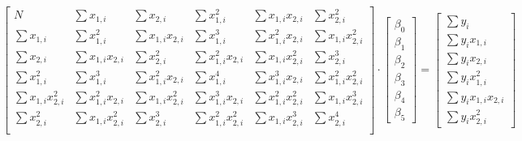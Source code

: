 \[\begin{bmatrix}
    N & \sum x_{1,i} & \sum x_{2, i} & \sum x_{1,i}^2 & \sum x_{1,i} x_{2,i} & \sum x_{2,i}^2 \\
    \sum x_{1,i} & \sum x_{1, i}^2 & \sum x_{1,i} x_{2, i} & \sum x_{1,i}^3 & \sum x_{1,i}^2 x_{2,i} & \sum x_{1,i} x_{2,i}^2 \\
    \sum x_{2,i} & \sum x_{1, i} x_{2, i} & \sum x_{2,i}^2 & \sum x_{1,i}^2 x_{2,i} & \sum x_{1,i} x_{2,i}^2 & \sum x_{2,i}^3 \\
    \sum x_{1,i}^2 & \sum x_{1, i}^3 & \sum x_{1,i}^2 x_{2, i} & \sum x_{1,i}^4 & \sum x_{1,i}^3 x_{2,i} & \sum x_{1,i}^2x_{2,i}^2 \\
    \sum x_{1,i} x^2_{2, i} & \sum x_{1, i}^2x_{2, i} & \sum x_{1,i} x_{2, i}^2 & \sum x_{1,i}^3 x_{2, i} & \sum x_{1,i}^2 x_{2,i}^2 & \sum x_{1,i}x_{2,i}^3 \\
    \sum x_{2,i}^2 & \sum x_{1, i} x_{2, i}^2 & \sum x_{2,i}^3 & \sum x_{1,i}^2 x_{2,i}^2 & \sum x_{1,i} x_{2,i}^3 & \sum x_{2,i}^4 \\
\end{bmatrix} \cdot \begin{bmatrix}
    \beta_0 \\
    \beta_1 \\
    \beta_2 \\
    \beta_3 \\
    \beta_4 \\
    \beta_5
\end{bmatrix} = \begin{bmatrix}
    \sum y_i \\
    \sum y_i x_{1, i}\\
    \sum y_i x_{2, i}\\
    \sum y_i x_{1, i}^2\\
    \sum y_i x_{1, i} x_{2, i} \\
    \sum y_i x_{2, i}^2
\end{bmatrix}\]

\pagebreak